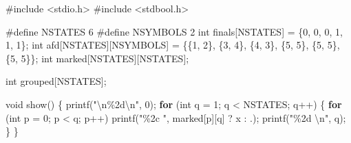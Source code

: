 \documentclass[
  brazilian,
  letterpaper,
]{book}
\newenvironment{Shaded}{\begin{snugshade}}{\end{snugshade}}
\newcommand{\CharTok}[1]{\textcolor[rgb]{0.13,0.47,0.30}{#1}}
\newcommand{\ControlFlowTok}[1]{\textcolor[rgb]{0.00,0.23,0.31}{\textbf{#1}}}
\newcommand{\DataTypeTok}[1]{\textcolor[rgb]{0.68,0.00,0.00}{#1}}
\newcommand{\DecValTok}[1]{\textcolor[rgb]{0.68,0.00,0.00}{#1}}
\newcommand{\ImportTok}[1]{\textcolor[rgb]{0.00,0.46,0.62}{#1}}
\newcommand{\NormalTok}[1]{\textcolor[rgb]{0.00,0.23,0.31}{#1}}
\newcommand{\OperatorTok}[1]{\textcolor[rgb]{0.37,0.37,0.37}{#1}}
\newcommand{\PreprocessorTok}[1]{\textcolor[rgb]{0.68,0.00,0.00}{#1}}
\newcommand{\SpecialCharTok}[1]{\textcolor[rgb]{0.37,0.37,0.37}{#1}}
\newcommand{\StringTok}[1]{\textcolor[rgb]{0.13,0.47,0.30}{#1}}
\theoremstyle{plain}
\theoremstyle{definition}
\theoremstyle{remark}
\begin{document}
\begin{Shaded}
\begin{Highlighting}[]
\PreprocessorTok{\#include }\ImportTok{\textless{}stdio.h\textgreater{}}
\PreprocessorTok{\#include }\ImportTok{\textless{}stdbool.h\textgreater{}}

\PreprocessorTok{\#define NSTATES }\DecValTok{6}
\PreprocessorTok{\#define NSYMBOLS }\DecValTok{2}
\DataTypeTok{int}\NormalTok{ finals}\OperatorTok{[}\NormalTok{NSTATES}\OperatorTok{]} \OperatorTok{=} \OperatorTok{\{}\DecValTok{0}\OperatorTok{,} \DecValTok{0}\OperatorTok{,} \DecValTok{0}\OperatorTok{,} \DecValTok{1}\OperatorTok{,} \DecValTok{1}\OperatorTok{,} \DecValTok{1}\OperatorTok{\};}
\DataTypeTok{int}\NormalTok{ afd}\OperatorTok{[}\NormalTok{NSTATES}\OperatorTok{][}\NormalTok{NSYMBOLS}\OperatorTok{]} \OperatorTok{=}
    \OperatorTok{\{\{}\DecValTok{1}\OperatorTok{,} \DecValTok{2}\OperatorTok{\},}
     \OperatorTok{\{}\DecValTok{3}\OperatorTok{,} \DecValTok{4}\OperatorTok{\},}
     \OperatorTok{\{}\DecValTok{4}\OperatorTok{,} \DecValTok{3}\OperatorTok{\},}
     \OperatorTok{\{}\DecValTok{5}\OperatorTok{,} \DecValTok{5}\OperatorTok{\},}
     \OperatorTok{\{}\DecValTok{5}\OperatorTok{,} \DecValTok{5}\OperatorTok{\},}
     \OperatorTok{\{}\DecValTok{5}\OperatorTok{,} \DecValTok{5}\OperatorTok{\}\};}
\DataTypeTok{int}\NormalTok{ marked}\OperatorTok{[}\NormalTok{NSTATES}\OperatorTok{][}\NormalTok{NSTATES}\OperatorTok{];}

\DataTypeTok{int}\NormalTok{ grouped}\OperatorTok{[}\NormalTok{NSTATES}\OperatorTok{];}

\DataTypeTok{void}\NormalTok{ show}\OperatorTok{()}
\OperatorTok{\{}
\NormalTok{    printf}\OperatorTok{(}\StringTok{"}\SpecialCharTok{\textbackslash{}n\%2d\textbackslash{}n}\StringTok{"}\OperatorTok{,} \DecValTok{0}\OperatorTok{);}
    \ControlFlowTok{for} \OperatorTok{(}\DataTypeTok{int}\NormalTok{ q }\OperatorTok{=} \DecValTok{1}\OperatorTok{;}\NormalTok{ q }\OperatorTok{\textless{}}\NormalTok{ NSTATES}\OperatorTok{;}\NormalTok{ q}\OperatorTok{++)}
    \OperatorTok{\{}
        \ControlFlowTok{for} \OperatorTok{(}\DataTypeTok{int}\NormalTok{ p }\OperatorTok{=} \DecValTok{0}\OperatorTok{;}\NormalTok{ p }\OperatorTok{\textless{}}\NormalTok{ q}\OperatorTok{;}\NormalTok{ p}\OperatorTok{++)}
\NormalTok{            printf}\OperatorTok{(}\StringTok{"}\SpecialCharTok{\%2c}\StringTok{ "}\OperatorTok{,}\NormalTok{ marked}\OperatorTok{[}\NormalTok{p}\OperatorTok{][}\NormalTok{q}\OperatorTok{]} \OperatorTok{?} \CharTok{\textquotesingle{}x\textquotesingle{}} \OperatorTok{:} \CharTok{\textquotesingle{}.\textquotesingle{}}\OperatorTok{);}
\NormalTok{        printf}\OperatorTok{(}\StringTok{"}\SpecialCharTok{\%2d}\StringTok{ }\SpecialCharTok{\textbackslash{}n}\StringTok{"}\OperatorTok{,}\NormalTok{ q}\OperatorTok{);}
    \OperatorTok{\}}
\OperatorTok{\}}


\end{Highlighting}
\end{Shaded}
\end{document}
